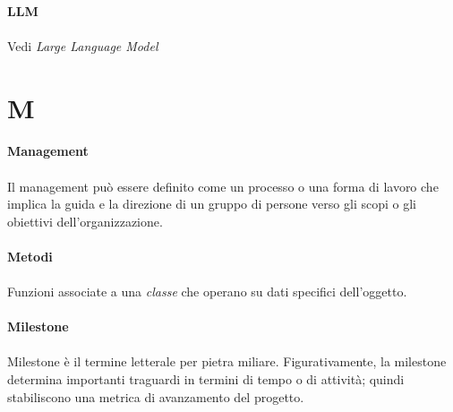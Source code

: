 \documentclass[10pt, a4paper]{article}
\begin{document}
\vspace{2em}
\paragraph{LLM}\noindent\hrulefill
\paragraph{}Vedi \textit{Large Language Model\pg}





\newpage
\section{M}

\vspace{2em}
\paragraph{Management}\noindent\hrulefill
\paragraph{}Il management può essere definito come un processo o una forma di lavoro che implica la guida e la direzione di un gruppo di persone verso gli scopi o gli obiettivi dell’organizzazione.

\vspace{2em}
\paragraph{Metodi}\noindent\hrulefill
\paragraph{}Funzioni associate a una \textit{classe\pg} che operano su dati specifici dell'oggetto.


\vspace{2em}
\paragraph{Milestone}\noindent\hrulefill
\paragraph{}Milestone è il termine letterale per pietra miliare. Figurativamente, la milestone determina importanti traguardi in termini di tempo o di attività; quindi stabiliscono una metrica di avanzamento del progetto.
\end{document}
